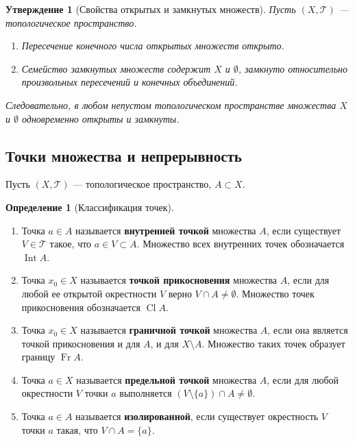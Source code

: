\documentclass[12pt,a4paper]{article}
\newtheorem{proposition}[theorem]{Утверждение}
\theoremstyle{definition}
\newtheorem{definition}[theorem]{Определение}
\newcommand{\Int}{\operatorname{Int}}
\newcommand{\Cl}{\operatorname{Cl}}
\newcommand{\Fr}{\operatorname{Fr}}
\begin{document}
\begin{proposition}[Свойства открытых и замкнутых множеств]
Пусть $(X, \mathcal{T})$ --- топологическое пространство.
\begin{enumerate}
    \item Пересечение конечного числа открытых множеств открыто.
    \item Семейство замкнутых множеств содержит $X$ и $\emptyset$, замкнуто относительно произвольных пересечений и конечных объединений.
\end{enumerate}
Следовательно, в любом непустом топологическом пространстве множества $X$ и $\emptyset$ одновременно открыты и замкнуты.
\end{proposition}

\subsection{Точки множества и непрерывность}

Пусть $(X, \mathcal{T})$ --- топологическое пространство, $A \subset X$.

\begin{definition}[Классификация точек]
\begin{enumerate}
    \item Точка $a \in A$ называется \textbf{внутренней точкой} множества $A$, если существует $V \in \mathcal{T}$ такое, что $a \in V \subset A$. Множество всех внутренних точек обозначается $\Int A$.
    \item Точка $x_0 \in X$ называется \textbf{точкой прикосновения} множества $A$, если для любой ее открытой окрестности $V$ верно $V \cap A \neq \emptyset$. Множество точек прикосновения обозначается $\Cl A$.
    \item Точка $x_0 \in X$ называется \textbf{граничной точкой} множества $A$, если она является точкой прикосновения и для $A$, и для $X \setminus A$. Множество таких точек образует границу $\Fr A$.
    \item Точка $a \in X$ называется \textbf{предельной точкой} множества $A$, если для любой окрестности $V$ точки $a$ выполняется $(V \setminus \{a\}) \cap A \neq \emptyset$.
    \item Точка $a \in A$ называется \textbf{изолированной}, если существует окрестность $V$ точки $a$ такая, что $V \cap A = \{a\}$.
\end{enumerate}
\end{definition}
\end{document}
